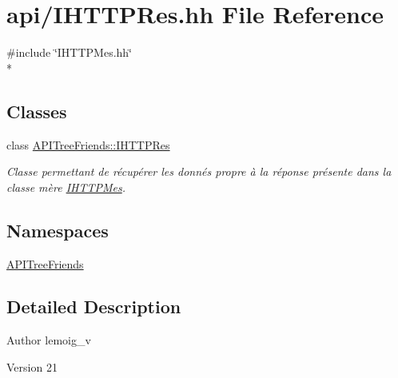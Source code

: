 \hypertarget{_i_h_t_t_p_res_8hh}{}\section{api/\+I\+H\+T\+T\+P\+Res.hh File Reference}
\label{_i_h_t_t_p_res_8hh}
{\ttfamily \#include \char`\"{}I\+H\+T\+T\+P\+Mes.\+hh\char`\"{}}\\*
\subsection*{Classes}
\begin{DoxyCompactItemize}
\item 
class \hyperlink{class_a_p_i_tree_friends_1_1_i_h_t_t_p_res}{A\+P\+I\+Tree\+Friends\+::\+I\+H\+T\+T\+P\+Res}
\begin{DoxyCompactList}\small\item\em Classe permettant de récupérer les donnés propre à la réponse présente dans la classe mère \hyperlink{class_a_p_i_tree_friends_1_1_i_h_t_t_p_mes}{I\+H\+T\+T\+P\+Mes}. \end{DoxyCompactList}\end{DoxyCompactItemize}
\subsection*{Namespaces}
\begin{DoxyCompactItemize}
\item 
 \hyperlink{namespace_a_p_i_tree_friends}{A\+P\+I\+Tree\+Friends}
\end{DoxyCompactItemize}


\subsection{Detailed Description}
\begin{DoxyAuthor}{Author}
lemoig\+\_\+v 
\end{DoxyAuthor}
\begin{DoxyVersion}{Version}
21 
\end{DoxyVersion}
